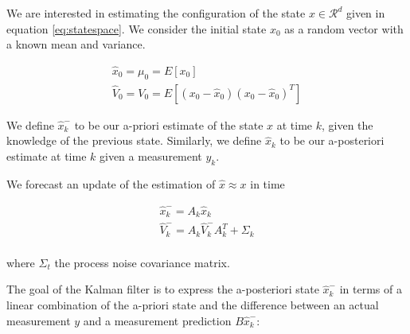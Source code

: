 \documentclass[mscthesis]{usiinfthesis}
\begin{document}


We are interested in estimating the configuration of the state $x \in \mathcal{R}^d$ given in equation \ref{eq:statespace}. We consider the initial state $x_0$ as a random vector with a known mean and variance.

\begin{eqfloat}
\begin{equation}
\begin{array}{l}
\hat{x}_0 = \mu_0 = E[x_0] \\
\hat{V}_0 = V_0 = E[(x_0-\hat{x}_0)(x_0-\hat{x}_0)^T] 
\end{array}
\label{eq:linear_kalman_init}
\end{equation}
\end{eqfloat}


\noindent We define $\hat{x}_k^-$ to be our a-priori estimate of the state $x$ at time $k$, given the knowledge of the previous state. Similarly, we define $\hat{x}_k$ to be our a-posteriori estimate at time $k$ given a measurement $y_k$. 

We forecast an update of the estimation of $\hat{x} \approx x$ in time

\begin{eqfloat}[H]
\begin{equation}
\begin{array}{l}
\hat{x}_k^- = A_k \hat{x}_k  \\
\hat{V}_k^- = A_k \hat{V}_k^- A_k^T + \Sigma_k \\
\end{array}
\label{eq:kalman_predict}
\end{equation}
\label{eq:linear_kalmann_prediction}
\end{eqfloat}

\noindent where $\Sigma_{t}$ the process noise covariance matrix. 


The goal of the Kalman filter is to express the a-posteriori state $\hat{x}_k^-$ in terms of a linear combination of the a-priori state and the difference between an actual measurement $y$ and a measurement prediction $B \hat{x}_k^-$:
\end{document}
